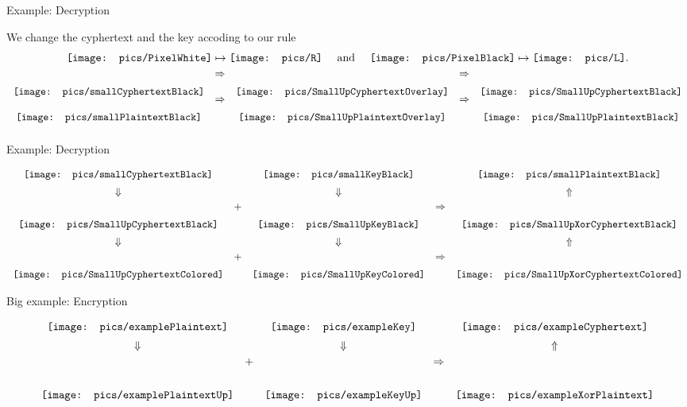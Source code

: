 \documentclass{beamer}
\newcommand{\pxWhite}{
 {\mathchoice
  {\texttt{[image: pics/PixelWhite]}}
  {\texttt{[image: pics/PixelWhite]}}
  {\texttt{[image: pics/PixelWhite]}}
  {\texttt{[image: pics/PixelWhite]}}
 }
}
\newcommand{\LL}{\mathord{\texttt{[image: pics/L]}}}
\newcommand{\RR}{\mathord{\texttt{[image: pics/R]}}}
\newcommand{\pxBlack}{\mathord{\texttt{[image: pics/PixelBlack]}}}
\newcommand{\smKeyBlack}{\mathord{\texttt{[image: pics/smallKeyBlack]}}}
\newcommand{\smMesBlack}{\mathord{\texttt{[image: pics/smallPlaintextBlack]}}}
\newcommand{\smCyphBlack}{\mathord{\texttt{[image: pics/smallCyphertextBlack]}}}
\newcommand{\smUpKeyBlack}{\mathord{\texttt{[image: pics/SmallUpKeyBlack]}}}
\newcommand{\smUpMesBlack}{\mathord{\texttt{[image: pics/SmallUpPlaintextBlack]}}}
\newcommand{\smUpCyphBlack}{\mathord{\texttt{[image: pics/SmallUpCyphertextBlack]}}}
\newcommand{\smUpKeyColored}{\mathord{\texttt{[image: pics/SmallUpKeyColored]}}}
\newcommand{\smUpCyphColored}{\mathord{\texttt{[image: pics/SmallUpCyphertextColored]}}}
\newcommand{\smUpMesOverlay}{\mathord{\texttt{[image: pics/SmallUpPlaintextOverlay]}}}
\newcommand{\smUpCyphOverlay}{\mathord{\texttt{[image: pics/SmallUpCyphertextOverlay]}}}
\newcommand{\smUpXorCyphColored}{\mathord{\texttt{[image: pics/SmallUpXorCyphertextColored]}}}
\newcommand{\smUpXorCyphBlack}{\mathord{\texttt{[image: pics/SmallUpXorCyphertextBlack]}}}
\newcommand{\exampleCyphertext}{\mathord{\texttt{[image: pics/exampleCyphertext]}}}
\newcommand{\exampleKey}{\mathord{\texttt{[image: pics/exampleKey]}}}
\newcommand{\exampleKeyUp}{\mathord{\texttt{[image: pics/exampleKeyUp]}}}
\newcommand{\examplePlaintext}{\mathord{\texttt{[image: pics/examplePlaintext]}}}
\newcommand{\examplePlaintextUp}{\mathord{\texttt{[image: pics/examplePlaintextUp]}}}
\newcommand{\exampleXorPlaintext}{\mathord{\texttt{[image: pics/exampleXorPlaintext]}}}
\begin{document}
\begin{frame}{Example: Decryption}

We change the cyphertext and the key accoding to our rule
\begin{equation*}
\pxWhite \mapsto \RR \quad\text{ and }\quad \pxBlack \mapsto \LL.
\end{equation*}
\begin{equation*}
\begin{array}{ccccc}
\smCyphBlack & \raisebox{4ex}{$\Rightarrow$} & \smUpCyphOverlay & \raisebox{4ex}{$\Rightarrow$} & \smUpCyphBlack\\
\smMesBlack & \raisebox{4ex}{$\Rightarrow$} & \smUpMesOverlay & \raisebox{4ex}{$\Rightarrow$} & \smUpMesBlack \vspace{0.5em}
\end{array}
\end{equation*}
\end{frame}


\begin{frame}{Example: Decryption}

\begin{equation*}
\begin{array}{ccccc}
\smCyphBlack  &  & \smKeyBlack & & \smMesBlack \vspace{0.5em}\\
\Downarrow &  & \Downarrow& & \Uparrow \vspace{0.5em}\\
\smUpCyphBlack & \raisebox{4ex}{+} & \smUpKeyBlack & \raisebox{4ex}{$\Rightarrow$} & \smUpXorCyphBlack \vspace{0.5em} \\
\Downarrow &  & \Downarrow& & \Uparrow \vspace{0.5em}\\
\smUpCyphColored & \raisebox{4ex}{+} & \smUpKeyColored & \raisebox{4ex}{$\Rightarrow$} & \smUpXorCyphColored
\end{array}
\end{equation*}


\end{frame}



\begin{frame}{Big example: Encryption}

\begin{equation*}
\begin{array}{ccccc}
\examplePlaintext &  & \exampleKey & & \exampleCyphertext \vspace{0.5em}\\
\Downarrow &  & \Downarrow& & \Uparrow \vspace{0.5em}\\
\examplePlaintextUp & \raisebox{7ex}{+} & \exampleKeyUp & \raisebox{7ex}{$\Rightarrow$} & \exampleXorPlaintext
\end{array}
\end{equation*}

\end{frame}
\end{document}
